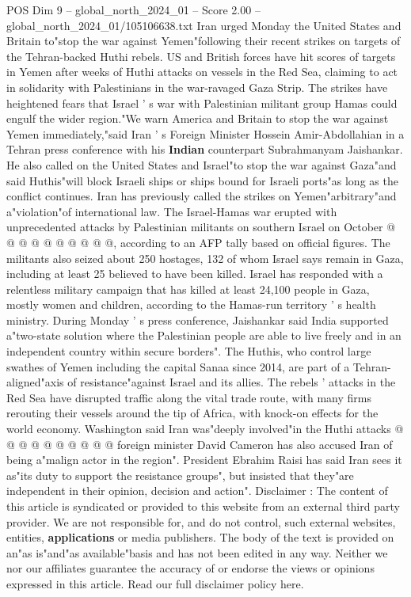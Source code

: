 \begin{textsample}{POS Dim 9 – global\_north\_2024\_01 – Score 2.00 – global\_north\_2024\_01/105106638.txt}  \label{ex:f9_pos_249}
Iran urged Monday the United States and Britain to"stop the war against Yemen"following their recent strikes on targets of the Tehran-backed Huthi rebels.
US and British forces have hit scores of targets in Yemen after weeks of Huthi attacks on vessels in the Red Sea, claiming to act in solidarity with Palestinians in the war-ravaged Gaza Strip.
The strikes have heightened fears that Israel ' s war with Palestinian militant group Hamas could engulf the wider region."We warn America and Britain to stop the war against Yemen immediately,"said Iran ' s Foreign Minister Hossein Amir-Abdollahian in a Tehran press conference with his \textbf{Indian} counterpart Subrahmanyam Jaishankar.
He also called on the United States and Israel"to stop the war against Gaza"and said Huthis"will block Israeli ships or ships bound for Israeli ports"as long as the conflict continues.
Iran has previously called the strikes on Yemen"arbitrary"and a"violation"of international law.
The Israel-Hamas war erupted with unprecedented attacks by Palestinian militants on southern Israel on October @ @ @ @ @ @ @ @ @ @, according to an AFP tally based on official figures.
The militants also seized about 250 hostages, 132 of whom Israel says remain in Gaza, including at least 25 believed to have been killed.
Israel has responded with a relentless military campaign that has killed at least 24,100 people in Gaza, mostly women and children, according to the Hamas-run territory ' s health ministry.
During Monday ' s press conference, Jaishankar said India supported a"two-state solution where the Palestinian people are able to live freely and in an independent country within secure borders".
The Huthis, who control large swathes of Yemen including the capital Sanaa since 2014, are part of a Tehran-aligned"axis of resistance"against Israel and its allies.
The rebels ' attacks in the Red Sea have disrupted traffic along the vital trade route, with many firms rerouting their vessels around the tip of Africa, with knock-on effects for the world economy.
Washington said Iran was"deeply involved"in the Huthi attacks @ @ @ @ @ @ @ @ @ @ foreign minister David Cameron has also accused Iran of being a"malign actor in the region".
President Ebrahim Raisi has said Iran sees it as"its duty to support the resistance groups", but insisted that they"are independent in their opinion, decision and action".
Disclaimer : The content of this article is syndicated or provided to this website from an external third party provider.
We are not responsible for, and do not control, such external websites, entities, \textbf{applications} or media publishers.
The body of the text is provided on an"as is"and"as available"basis and has not been edited in any way.
Neither we nor our affiliates guarantee the accuracy of or endorse the views or opinions expressed in this article.
Read our full disclaimer policy here.

\end{textsample}
